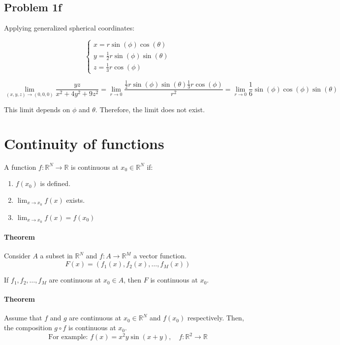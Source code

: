 \documentclass[11pt]{article}
\begin{document}
\subsection*{Problem 1f}
Applying generalized spherical coordinates:

\[
\begin{cases}
    x = r \sin(\phi) \cos(\theta) \\
    y = \frac{1}{2} r \sin(\phi) \sin(\theta) \\
    z = \frac{1}{3} r \cos(\phi)
\end{cases}
\]

\[
\lim_{(x,y,z) \to (0,0,0)} \frac{yz}{x^2 + 4y^2 + 9z^2} = \lim_{r \to 0} \frac{\frac{1}{2} r \sin(\phi) \sin(\theta) \frac{1}{3} r \cos(\phi)}{r^2} = \lim_{r \to 0} \frac{1}{6} \sin(\phi) \cos(\phi) \sin(\theta)
\]

This limit depends on $\phi$ and $\theta$. Therefore, the limit does not exist.

\section{Continuity of functions}
A function $f : \mathbb{R}^N \rightarrow \mathbb{R}$ is continuous at $x_0 \in \mathbb{R}^N$ if:
\begin{enumerate}
    \item $f(x_0)$ is defined.
    \item $\lim_{x \to x_0} f(x)$ exists.
    \item $\lim_{x \to x_0} f(x) = f(x_0)$
\end{enumerate}

\paragraph{Theorem}
Consider $A$ a subset in $\mathbb{R}^N$ and $f : A \rightarrow \mathbb{R}^M$ a vector function. 
\[
F(x) = (f_1(x), f_2(x), \ldots, f_M(x))
\]

If $f_1, f_2, \ldots, f_M$ are continuous at $x_0 \in A$, then $F$ is continuous at $x_0$.

\paragraph{Theorem}
Assume that $f$ and $g$ are continuous at $x_0 \in \mathbb{R}^N$ and $f(x_0)$ respectively. Then, the composition $g \circ f$ is continuous at $x_0$.
\[
\text{For example: } f(x) = x^2y \sin(x + y), \quad f : \mathbb{R}^2 \rightarrow \mathbb{R}
\]
\end{document}
